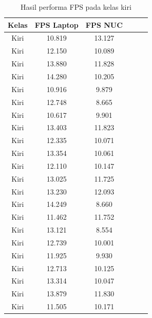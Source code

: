 \begin{longtable}{|c|c|c|c|c|c|}
  \caption{Hasil performa FPS pada kelas kiri}
  \label{tb:fpskiri} \\
  \hline
  \rowcolor[HTML]{C0C0C0} 
  \textbf{Kelas} & \textbf{FPS Laptop} & \textbf{FPS NUC} \\ \hline
  Kiri           & 10.819              & 13.127           \\ \hline
  Kiri           & 12.150              & 10.089           \\ \hline
  Kiri           & 13.880              & 11.828           \\ \hline
  Kiri           & 14.280              & 10.205           \\ \hline
  Kiri           & 10.916              & 9.879            \\ \hline
  Kiri           & 12.748              & 8.665            \\ \hline
  Kiri           & 10.617              & 9.901            \\ \hline
  Kiri           & 13.403              & 11.823           \\ \hline
  Kiri           & 12.335              & 10.071           \\ \hline
  Kiri           & 13.354              & 10.061           \\ \hline
  Kiri           & 12.110              & 10.147           \\ \hline
  Kiri           & 13.025              & 11.725           \\ \hline
  Kiri           & 13.230              & 12.093           \\ \hline
  Kiri           & 14.249              & 8.660            \\ \hline
  Kiri           & 11.462              & 11.752           \\ \hline
  Kiri           & 13.121              & 8.554            \\ \hline
  Kiri           & 12.739              & 10.001           \\ \hline
  Kiri           & 11.925              & 9.930            \\ \hline
  Kiri           & 12.713              & 10.125           \\ \hline
  Kiri           & 13.314              & 10.047           \\ \hline
  Kiri           & 13.879              & 11.830           \\ \hline
  Kiri           & 11.505              & 10.171           \\ \hline

\end{longtable}
